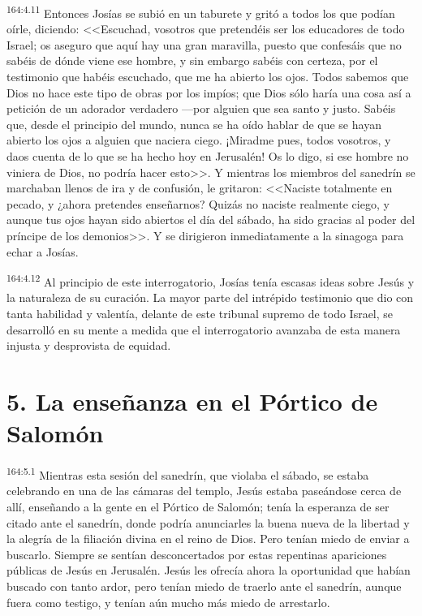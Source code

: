 \par 
\textsuperscript{164:4.11} Entonces Josías se subió en un taburete y gritó a todos los que podían oírle, diciendo: <<Escuchad, vosotros que pretendéis ser los educadores de todo Israel; os aseguro que aquí hay una gran maravilla, puesto que confesáis que no sabéis de dónde viene ese hombre, y sin embargo sabéis con certeza, por el testimonio que habéis escuchado, que me ha abierto los ojos. Todos sabemos que Dios no hace este tipo de obras por los impíos; que Dios sólo haría una cosa así a petición de un adorador verdadero ---por alguien que sea santo y justo. Sabéis que, desde el principio del mundo, nunca se ha oído hablar de que se hayan abierto los ojos a alguien que naciera ciego. ¡Miradme pues, todos vosotros, y daos cuenta de lo que se ha hecho hoy en Jerusalén! Os lo digo, si ese hombre no viniera de Dios, no podría hacer esto>>. Y mientras los miembros del sanedrín se marchaban llenos de ira y de confusión, le gritaron: <<Naciste totalmente en pecado, y ¿ahora pretendes enseñarnos? Quizás no naciste realmente ciego, y aunque tus ojos hayan sido abiertos el día del sábado, ha sido gracias al poder del príncipe de los demonios>>. Y se dirigieron inmediatamente a la sinagoga para echar a Josías.

\par 
\textsuperscript{164:4.12} Al principio de este interrogatorio, Josías tenía escasas ideas sobre Jesús y la naturaleza de su curación. La mayor parte del intrépido testimonio que dio con tanta habilidad y valentía, delante de este tribunal supremo de todo Israel, se desarrolló en su mente a medida que el interrogatorio avanzaba de esta manera injusta y desprovista de equidad.

\section*{5. La enseñanza en el Pórtico de Salomón}
\par 
\textsuperscript{164:5.1} Mientras esta sesión del sanedrín, que violaba el sábado, se estaba celebrando en una de las cámaras del templo, Jesús estaba paseándose cerca de allí, enseñando a la gente en el Pórtico de Salomón; tenía la esperanza de ser citado ante el sanedrín, donde podría anunciarles la buena nueva de la libertad y la alegría de la filiación divina en el reino de Dios. Pero tenían miedo de enviar a buscarlo. Siempre se sentían desconcertados por estas repentinas apariciones públicas de Jesús en Jerusalén. Jesús les ofrecía ahora la oportunidad que habían buscado con tanto ardor, pero tenían miedo de traerlo ante el sanedrín, aunque fuera como testigo, y tenían aún mucho más miedo de arrestarlo.

